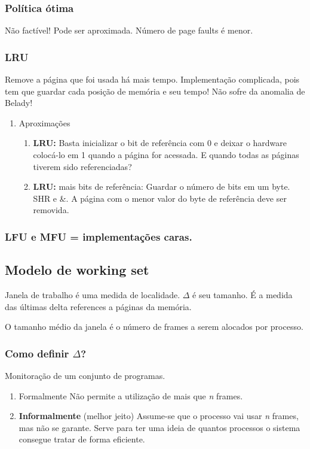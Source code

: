 \documentclass[11pt]{article}
\begin{document}
\subsubsection{Política ótima}
\label{sec:orgf8878e6}
Não factível! Pode ser aproximada. Número de page faults é menor.

\subsubsection{LRU}
\label{sec:org3510b92}
Remove a página que foi usada há mais tempo. Implementação complicada, pois tem que
guardar cada posição de memória e seu tempo! Não sofre da anomalia de Belady!
\begin{enumerate}
\item Aproximações
\label{sec:org7e7cf92}
\begin{enumerate}
\item \textbf{LRU:} Basta inicializar o bit de referência com 0 e deixar o hardware colocá-lo em 1 quando
a página for acessada. E quando todas as páginas tiverem sido referenciadas?
\item \textbf{LRU:} mais bits de referência: Guardar o número de bits em um byte. SHR e \&. A página com o menor valor do byte
de referência deve ser removida.
\end{enumerate}
\end{enumerate}


\subsubsection{LFU e MFU = implementações caras.}
\label{sec:orgc0a8c6b}

\subsection{Modelo de working set}
\label{sec:orgba59e4c}
Janela de trabalho é uma medida de localidade. \(\Delta\) é seu tamanho. É a medida das
últimas delta references a páginas da memória.

O tamanho médio da janela é o número de frames a serem alocados por processo.

\subsubsection{Como definir \(\Delta\)?}
\label{sec:org62bf2ad}
Monitoração de um conjunto de programas.

\begin{enumerate}
\item Formalmente Não permite a utilização de mais que \emph{n} frames.
\item \textbf{Informalmente} (melhor jeito) Assume-se que o processo vai usar \emph{n} frames, mas não se garante.
Serve para ter uma ideia de quantos processos o sistema consegue tratar de forma eficiente.
\end{enumerate}
\end{document}
